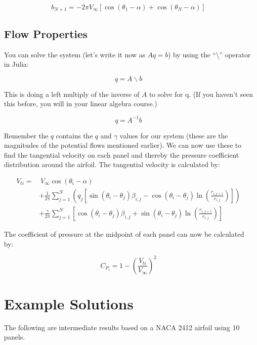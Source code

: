 \documentclass{article}%
\begin{document}
\begin{equation}
	b_{N+1} = -2\pi V_{\infty} \left[ \cos(\theta_1 - \alpha) + \cos(\theta_N - \alpha) \right]
\end{equation}

\subsection*{Flow Properties}

You can solve the system (let's write it now as $Aq=b$) by using the ``\textbackslash'' operator in Julia:

\begin{equation}
q = A \backslash b
\end{equation}

This is doing a left multiply of the inverse of $A$ to solve for q. (If you haven't seen this before, you will in your linear algebra course.)

\begin{equation}
	q = A^{-1} b
\end{equation}

Remember the $q$ contains the $q$ and $\gamma$ values for our system (these are the magnitudes of the potential flows mentioned earlier). We can now use these to find the tangential velocity on each panel and thereby the pressure coefficient distribution around the airfoil.  The tangential velocity is calculated by:

\begin{equation}
	\begin{aligned}
		V_{ti} =& ~V_\infty \cos(\theta_i-\alpha) \\
		&+ \frac{1}{2\pi} \sum_{j=1}^N \left( q_j\left[ \sin(\theta_i-\theta_j)\beta_{i,j} - \cos(\theta_i-\theta_j) \ln\left(\frac{r_{i,j+1}}{r_{i,j}}\right) \right] \right)\\
		&+ \frac{\gamma}{2\pi} \sum_{j=1}^N \left[ \cos(\theta_i-\theta_j)\beta_{i,j} + \sin(\theta_i-\theta_j) \ln\left(\frac{r_{i,j+1}}{r_{i,j}}\right) \right]
	\end{aligned}
\end{equation}

The coefficient of pressure at the midpoint of each panel can now be calculated by:

\begin{equation}
	C_{P_i} = 1- \left(\frac{V_{ti}}{V_\infty}\right)^2
\end{equation}


\section*{Example Solutions}

The following are intermediate results based on a NACA 2412 airfoil using 10 panels.
\end{document}
